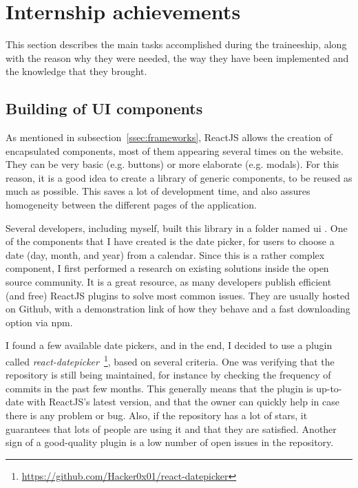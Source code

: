 \section{Internship achievements}
\label{sec:accomplish}

This section describes the main tasks accomplished during the traineeship, along with the reason why they were needed, the way they have been implemented and the knowledge that they brought.

\subsection{Building of UI components}
\label{ssec:ui_components}

As mentioned in {\sc subsection}~\ref{ssec:frameworks}, ReactJS allows the creation of encapsulated components, most of them appearing several times on the website. They can be very basic (e.g. buttons) or more elaborate (e.g. modals). For this reason, it is a good idea to create a library of generic components, to be reused as much as possible. This saves a lot of development time, and also assures homogeneity between the different pages of the application.

Several developers, including myself, built this library in a folder named \guillemotleft{} ui \guillemotright{}. One of the components that I have created is the date picker, for users to choose a date (day, month, and year) from a calendar. Since this is a rather complex component, I first performed a research on existing solutions inside the open source community. It is a great resource, as many developers publish efficient (and free) ReactJS plugins to solve most common issues. They are usually hosted on Github, with a demonstration link of how they behave and a fast downloading option via npm.

I found a few available date pickers, and in the end, I decided to use a plugin called \textit{react-datepicker}~\footnote{\url{https://github.com/Hacker0x01/react-datepicker}}, based on several criteria. One was verifying that the repository is still being maintained, for instance by checking the frequency of commits in the past few months. This generally means that the plugin is up-to-date with ReactJS's latest version, and that the owner can quickly help in case there is any problem or bug. Also, if the repository has a lot of stars, it guarantees that lots of people are using it and that they are satisfied. Another sign of a good-quality plugin is a low number of open issues in the repository.

